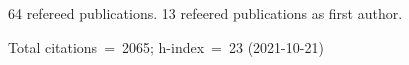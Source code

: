 64 refereed publications. 13 refeered publications as first author.

Total citations~=~2065; h-index~=~23 (2021-10-21)